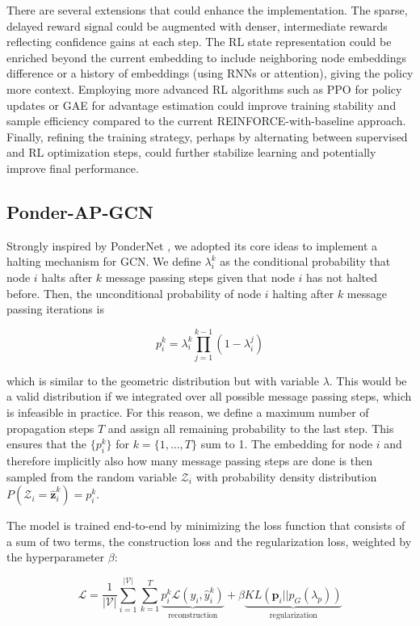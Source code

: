 \documentclass{gdl}
\begin{document}
There are several extensions that could enhance the implementation. The sparse, delayed reward signal could be augmented with denser, intermediate rewards reflecting confidence gains at each step. The RL state representation could be enriched beyond the current embedding to include neighboring node embeddings difference or a history of embeddings (using RNNs or attention), giving the policy more context. Employing more advanced RL algorithms such as PPO for policy updates or GAE for advantage estimation could improve training stability and sample efficiency compared to the current REINFORCE-with-baseline approach. Finally, refining the training strategy, perhaps by alternating between supervised and RL optimization steps, could further stabilize learning and potentially improve final performance.

\subsection{Ponder-AP-GCN}
Strongly inspired by PonderNet \cite{banino2021}, we adopted its core ideas to implement a halting mechanism for GCN. We define $\lambda_i^k$ as the conditional probability that node $i$ halts after $k$ message passing steps given that node $i$ has not halted before. Then, the unconditional probability of node $i$ halting after $k$ message passing iterations is

\begin{equation}
p_i^k = \lambda_i^k \prod_{j=1}^{k-1} (1-\lambda_i^j)
\end{equation}

\noindent which is similar to the geometric distribution but with variable $\lambda$. This would be a valid distribution if we integrated over all possible message passing steps, which is infeasible in practice. For this reason, we define a maximum number of propagation steps $T$ and assign all remaining probability to the last step. This ensures that the $\{p_i^k\}$ for $k = \{1,...,T\}$ sum to 1. The embedding for node $i$ and therefore implicitly also how many message passing steps are done is then sampled from the random variable $\mathcal{Z}_i$ with probability density distribution $P(\mathcal{Z}_i=\hat{\mathbf{z}}_i^k) = p_i^k$.

The model is trained end-to-end by minimizing the loss function that consists of a sum of two terms, the construction loss and the regularization loss, weighted by the hyperparameter $\beta$:

\begin{equation}
\mathcal{L} = \frac{1}{|\mathcal{V}|} \sum_{i=1}^{\mathcal{|V|}} \sum_{k=1}^{T} \underbrace{p_i^k \mathcal{L}(y_i, \hat{y}_i^k)}_{\text{reconstruction}} + \beta \underbrace{KL(\mathbf{p}_i || p_G(\lambda_p))}_{\text{regularization}}
\label{eq:ponder-loss}
\end{equation}
\end{document}
